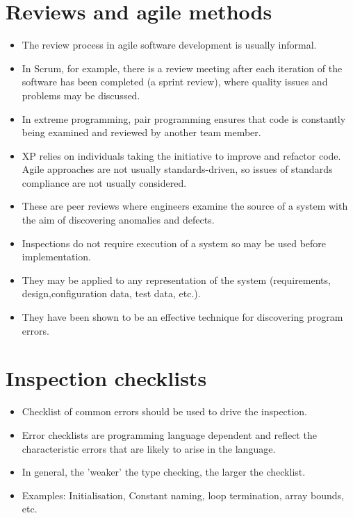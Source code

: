 \section {Reviews and agile methods}
\begin{itemize}

\item The review process in agile software development is usually informal.

  \item In Scrum, for example, there is a review meeting after each iteration of the software has been completed (a sprint review), where quality issues and problems may be discussed.

\item In extreme programming, pair programming ensures that code is constantly being examined and reviewed by another team member.

\item XP relies on individuals taking the initiative to improve and refactor code. Agile approaches are not usually standards-driven, so issues of standards compliance are not usually considered.

\item These are peer reviews where engineers examine the source of a system with the aim of discovering anomalies and defects.

\item Inspections do not require execution of a system so may be used before implementation.

\item They may be applied to any representation of the system (requirements, design,configuration data, test data, etc.).

\item They have been shown to be an effective technique for discovering program errors.

\end{itemize}
\section {Inspection checklists}
\begin{itemize}

\item Checklist of common errors should be used to drive the inspection.

\item Error checklists are programming language dependent and reflect the characteristic errors that are likely to arise in the language.

\item In general, the 'weaker' the type checking, the larger the checklist.

\item Examples: Initialisation, Constant naming, loop termination, array bounds, etc.
\end{itemize}
\newpage
